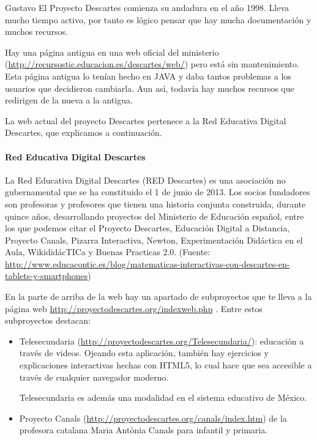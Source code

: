 \begin{opin}{\guscolor}{Gustavo}
El Proyecto Descartes comienza su andadura en el año 1998. Lleva mucho tiempo activo, por tanto es lógico pensar que hay mucha documentación y muchos recursos.

Hay una página antigua en una web oficial del ministerio (\url{http://recursostic.educacion.es/descartes/web/}) pero está sin mantenimiento. Esta página antigua lo tenían hecho en JAVA y daba tantos problemas a los usuarios que decidieron cambiarla. Aun así, todavía hay muchos recursos que redirigen de la nueva a la antigua.

La web actual del proyecto Descartes pertenece a la Red Educativa Digital Descartes, que explicamos a continuación.

\paragraph{Red Educativa Digital Descartes}
La Red Educativa Digital Descartes (RED Descartes) es una asociación no gubernamental que se ha constituido el 1 de junio de 2013. Los socios fundadores son profesoras y profesores que tienen una historia conjunta construida, durante quince años, desarrollando proyectos del Ministerio de Educación español, entre los que podemos citar el Proyecto Descartes, Educación Digital a Distancia, Proyecto Canals, Pizarra Interactiva, Newton, Experimentación Didáctica en el Aula, WikididácTICa y Buenas Practicas 2.0. (Fuente: \url{http://www.educacontic.es/blog/matematicas-interactivas-con-descartes-en-tablets-y-smartphones})

En la parte de arriba de la web hay un apartado de subproyectos que te lleva a la página web \url{http://proyectodescartes.org/indexweb.php} . Entre estos subproyectos destacan:
\begin{itemize}
\item Telesecundaria (\url{http://proyectodescartes.org/Telesecundaria/}): educación a través de videos. Ojeando esta aplicación, también hay ejercicios y explicaciones interactivas hechas con HTML5, lo cual hace que sea accesible a través de cualquier navegador moderno. 

Telesecundaria es además una modalidad en el sistema educativo de México.

 

\item Proyecto Canals (\url{http://proyectodescartes.org/canals/index.htm}) de la profesora catalana Maria Antònia Canals para infantil y primaria. 

 


\end{itemize}
\end{opin}
